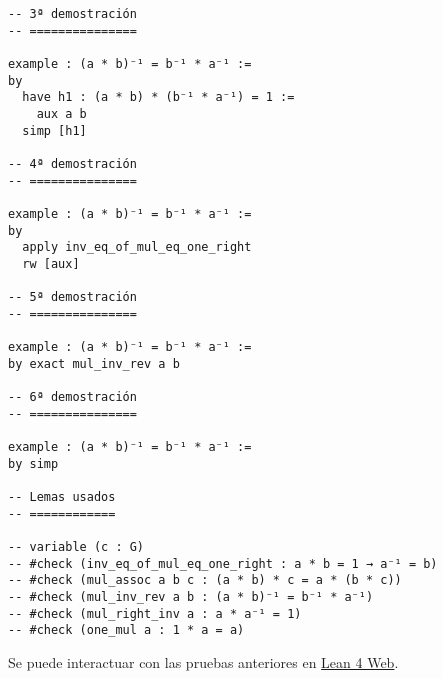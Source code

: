 \begin{verbatim}
-- 3ª demostración
-- ===============

example : (a * b)⁻¹ = b⁻¹ * a⁻¹ :=
by
  have h1 : (a * b) * (b⁻¹ * a⁻¹) = 1 :=
    aux a b
  simp [h1]

-- 4ª demostración
-- ===============

example : (a * b)⁻¹ = b⁻¹ * a⁻¹ :=
by
  apply inv_eq_of_mul_eq_one_right
  rw [aux]

-- 5ª demostración
-- ===============

example : (a * b)⁻¹ = b⁻¹ * a⁻¹ :=
by exact mul_inv_rev a b

-- 6ª demostración
-- ===============

example : (a * b)⁻¹ = b⁻¹ * a⁻¹ :=
by simp

-- Lemas usados
-- ============

-- variable (c : G)
-- #check (inv_eq_of_mul_eq_one_right : a * b = 1 → a⁻¹ = b)
-- #check (mul_assoc a b c : (a * b) * c = a * (b * c))
-- #check (mul_inv_rev a b : (a * b)⁻¹ = b⁻¹ * a⁻¹)
-- #check (mul_right_inv a : a * a⁻¹ = 1)
-- #check (one_mul a : 1 * a = a)
\end{verbatim}
Se puede interactuar con las pruebas anteriores en \href{https://lean.math.hhu.de/\#url=https://raw.githubusercontent.com/jaalonso/Calculemus2/main/src/Inverso\_del\_producto.lean}{Lean 4 Web}.

